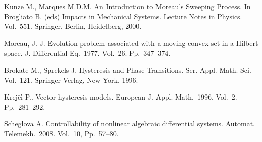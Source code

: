 \documentclass[12pt]{llncs}
\begin{document}
\begin{thebibliography}{9} %


 Kunze  M., Marques  M.D.M. An Introduction to Moreau’s Sweeping Process. In  Brogliato B. (eds) Impacts in Mechanical Systems. Lecture Notes in Physics. Vol.~551. Springer, Berlin, Heidelberg, 2000.
 
 Moreau, J.-J. Evolution problem associated with a moving convex set in a Hilbert space. J. Differential Eq.~1977. Vol.~26. Pp.~347--374.  


 Brokate  M.,  Sprekels  J. Hysteresis and Phase Transitions. Ser. Appl. Math. Sci. Vol.~121.  Springer-Verlag, New York, 1996. 



 Krej\u{c}\'{\i} P..  Vector hysteresis models. European J. Appl. Math.~1996. Vol.~2. Pp.~281--292.


 Scheglova  A.   Controllability of nonlinear algebraic differential systems. Automat. Telemekh.~2008. Vol.~10, Pp.~57--80.



\end{thebibliography}

\end{document}
